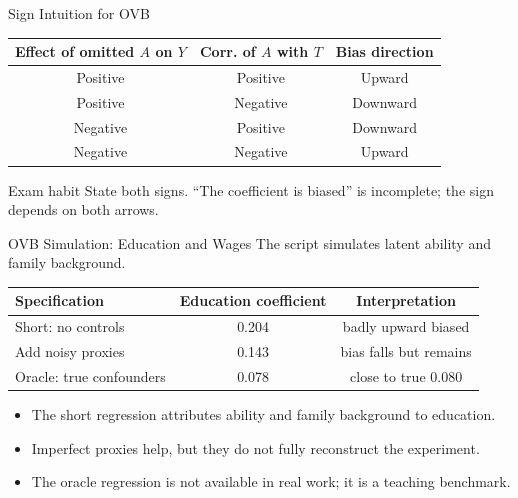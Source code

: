 \documentclass[11pt,aspectratio=169]{beamer}
\begin{document}
\begin{frame}{Sign Intuition for OVB}
  \begin{center}
    \begin{tabular}{@{}ccc@{}}
      \toprule
      Effect of omitted \(A\) on \(Y\) & Corr. of \(A\) with \(T\) & Bias direction \\
      \midrule
      Positive & Positive & Upward \\
      Positive & Negative & Downward \\
      Negative & Positive & Downward \\
      Negative & Negative & Upward \\
      \bottomrule
    \end{tabular}
  \end{center}
  \vspace{0.4em}
  \begin{block}{Exam habit}
    State both signs. ``The coefficient is biased'' is incomplete; the sign depends on both arrows.
  \end{block}
\end{frame}

\begin{frame}{OVB Simulation: Education and Wages}
  The script simulates latent ability and family background.
  \vspace{0.3em}

  \begin{center}
    \begin{tabular}{@{}lcc@{}}
      \toprule
      Specification & Education coefficient & Interpretation \\
      \midrule
      Short: no controls & 0.204 & badly upward biased \\
      Add noisy proxies & 0.143 & bias falls but remains \\
      Oracle: true confounders & 0.078 & close to true 0.080 \\
      \bottomrule
    \end{tabular}
  \end{center}
  \vspace{0.3em}
  \begin{itemize}
    \item The short regression attributes ability and family background to education.
    \item Imperfect proxies help, but they do not fully reconstruct the experiment.
    \item The oracle regression is not available in real work; it is a teaching benchmark.
  \end{itemize}
\end{frame}
\end{document}

